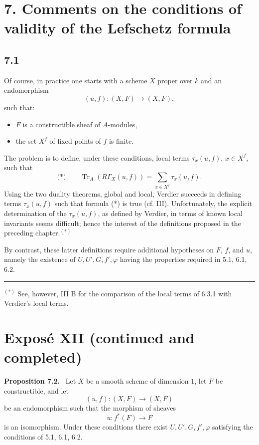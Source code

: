 \documentclass[11pt]{article}
\newenvironment{statement}[1]{\par\medskip\noindent\textbf{#1.}\ }{\par\medskip}
\providecommand{\Tr}{\operatorname{Tr}}
\providecommand{\Tr}{\operatorname{Tr}}
\providecommand{\Tr}{\operatorname{Tr}}
\providecommand{\Tr}{\operatorname{Tr}}
\providecommand{\Tr}{\operatorname{Tr}}
\begin{document}
\section*{7. Comments on the conditions of validity of the Lefschetz formula}

\subsection*{7.1}
Of course, in practice one starts with a scheme $X$ proper over $k$ and an endomorphism
\[
(u,f):(X,F)\longrightarrow (X,F),
\]
such that:
\begin{itemize}
\item $F$ is a constructible sheaf of $A$-modules,
\item the set $X^f$ of fixed points of $f$ is finite.
\end{itemize}
The problem is to define, under these conditions, local terms $\tau_x(u,f)$, $x\in X^f$, such that
\[
\text{(*)}\qquad \Tr_A(R\Gamma_X(u,f))=\sum_{x\in X^f}\tau_x(u,f).
\]
Using the two duality theorems, global and local, Verdier succeeds in defining terms $\tau_x(u,f)$ such that formula (*) is true (cf. III). Unfortunately, the explicit determination of the $\tau_x(u,f)$, as defined by Verdier, in terms of known local invariants seems difficult; hence the interest of the definitions proposed in the preceding chapter.$^{(*)}$

By contrast, these latter definitions require additional hypotheses on $F$, $f$, and $u$, namely the existence of $U,U',G,f',\varphi$ having the properties required in 5.1, 6.1, 6.2.

\bigskip
\noindent
\rule{6cm}{0.4pt}

$^{(*)}$ See, however, III B for the comparison of the local terms of 6.3.1 with Verdier's local terms.


\section*{Exposé XII (continued and completed)}

\begin{statement}{Proposition 7.2}
Let $X$ be a smooth scheme of dimension $1$, let $F$ be constructible, and let
\[
(u,f):(X,F)\longrightarrow (X,F)
\]
be an endomorphism such that the morphism of sheaves
\[
u:f^*(F)\longrightarrow F
\]
is an isomorphism. Under these conditions there exist $U,U',G,f',\varphi$ satisfying the conditions of 5.1, 6.1, 6.2.
\end{statement}
\end{document}
